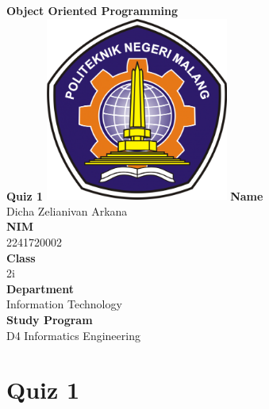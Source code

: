 \documentclass[12pt,titlepage]{article}
\newcommand{\vSubject}{Object Oriented Programming}
\newcommand{\vSubtitle}{Quiz 1}
\newcommand{\vName}{Dicha Zelianivan Arkana}
\newcommand{\vNIM}{2241720002}
\newcommand{\vClass}{2i}
\newcommand{\vDepartment}{Information Technology}
\newcommand{\vStudyProgram}{D4 Informatics Engineering}
\begin{document}
\begin{titlepage}
    \centering
    \vfill
    {\bfseries\LARGE
        \vSubject\\
        \vskip0.25cm
        \vSubtitle
    }
    \vfill
    \includegraphics[width=6cm]{images/polinema-logo.png}
    \vfill
    {
        \textbf{Name}\\
        \vName\\
        \vskip0.5cm
        \textbf{NIM}\\
        \vNIM\\
        \vskip0.5cm
        \textbf{Class}\\
        \vClass\\
        \vskip0.5cm
        \textbf{Department}\\
        \vDepartment\\
        \vskip0.5cm
        \textbf{Study Program}\\
        \vStudyProgram
    }
\end{titlepage}

\section*{Quiz 1}
\end{document}
